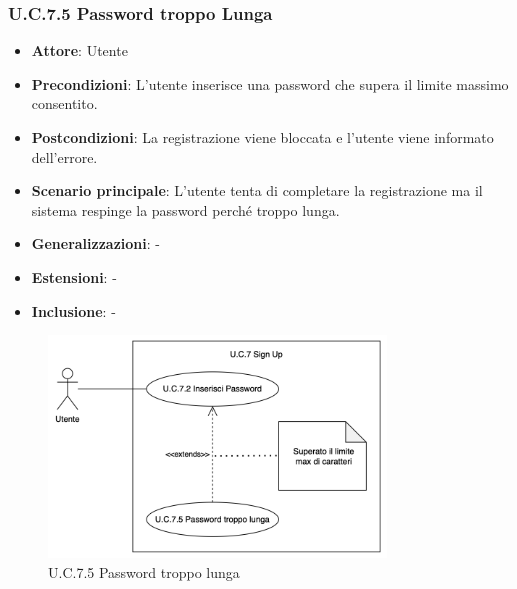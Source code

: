 \subsubsection{U.C.7.5 Password troppo Lunga}
\begin{itemize}
    \item \textbf{Attore}: Utente
    \item \textbf{Precondizioni}: L'utente inserisce una password che supera il limite massimo consentito.
    \item \textbf{Postcondizioni}: La registrazione viene bloccata e l'utente viene informato dell'errore.  
    \item \textbf{Scenario principale}: L'utente tenta di completare la registrazione ma il sistema respinge la password perché troppo lunga. 
    \item \textbf{Generalizzazioni}: -
    \item \textbf{Estensioni}: -
    \item \textbf{Inclusione}: -
\end{itemize}
\begin{figure}[H]
    \centering
    \includegraphics[width=0.8\textwidth]{img/UC7.5.png}
    \caption{U.C.7.5 Password troppo lunga}
\end{figure}
\newpage


